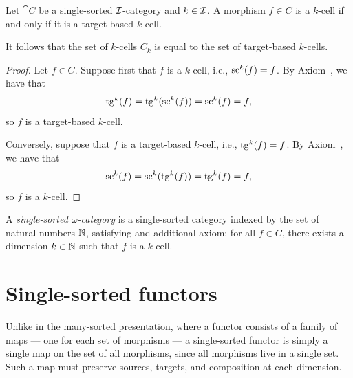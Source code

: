\begin{theorem}
  \label{thm:cell_sc_iff_cell_tg}
  \leanok
  Let $\cat{C}$ be a single-sorted $\mathcal{I}$-category and $k \in \mathcal{I}$. A morphism $f \in C$ is a
  $k$-cell if and only if it is a target-based $k$-cell.

  It follows that the set of $k$-cells $C_k$ is equal to the set of target-based $k$-cells.
\end{theorem}

\begin{proof}
  \leanok
  Let $f \in C$. Suppose first that $f$ is a $k$-cell, i.e., $\operatorname{sc}^k (f) = f$. By
  Axiom~, we have that
  \[
    \operatorname{tg}^k (f) = \operatorname{tg}^k (\operatorname{sc}^k (f)) = \operatorname{sc}^k (f) = f,
  \]
  so $f$ is a target-based $k$-cell.

  Conversely, suppose that $f$ is a target-based $k$-cell, i.e., $\operatorname{tg}^k (f) = f$. By
  Axiom~, we have that
  \[
    \operatorname{sc}^k (f) = \operatorname{sc}^k (\operatorname{tg}^k (f)) = \operatorname{tg}^k (f) = f,
  \]
  so $f$ is a $k$-cell.
\end{proof}

\begin{definition}
  \label{def:SingleSortedOmegaCategory}
  \leanok
  A \emph{single-sorted $\omega$-category} is a single-sorted category indexed by the set of natural
  numbers $\mathbb{N}$, satisfying and additional axiom: for all $f \in C$, there exists a dimension $k \in
  \mathbb{N}$ such that $f$ is a $k$-cell.
\end{definition}

\section{Single-sorted functors}

Unlike in the many-sorted presentation, where a functor consists of a family of maps --- one for
each set of morphisms --- a single-sorted functor is simply a single map on the set of all
morphisms, since all morphisms live in a single set. Such a map must preserve sources, targets, and
composition at each dimension.

